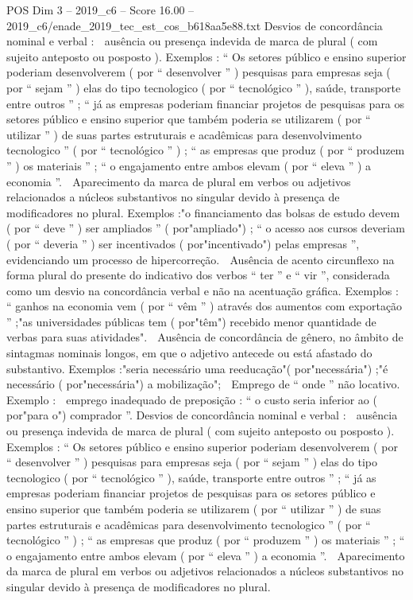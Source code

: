 \begin{textsample}{POS Dim 3 – 2019\_c6 – Score 16.00 – 2019\_c6/enade\_2019\_tec\_est\_cos\_b618aa5e88.txt}
Desvios de concordância nominal e verbal :  ausência ou presença indevida de marca de plural ( com sujeito anteposto ou posposto ).
Exemplos : “ Os setores público e ensino superior poderiam desenvolverem ( por “ desenvolver ” ) pesquisas para empresas seja ( por “ sejam ” ) elas do tipo tecnologico ( por “ tecnológico ” ), saúde, transporte entre outros ” ; “ já as empresas poderiam financiar projetos de pesquisas para os setores público e ensino superior que também poderia se utilizarem ( por “ utilizar ” ) de suas partes estruturais e acadêmicas para desenvolvimento tecnologico ” ( por “ tecnológico ” ) ; “ as empresas que produz ( por “ produzem ” ) os materiais ” ; “ o engajamento entre ambos elevam ( por “ eleva ” ) a economia ”.  Aparecimento da marca de plural em verbos ou adjetivos relacionados a núcleos substantivos no singular devido à presença de modificadores no plural.
Exemplos :"o financiamento das bolsas de estudo devem ( por “ deve ” ) ser ampliados ” ( por"ampliado") ; “ o acesso aos cursos deveriam ( por “ deveria ” ) ser incentivados ( por"incentivado") pelas empresas ”, evidenciando um processo de hipercorreção.  Ausência de acento circunflexo na forma plural do presente do indicativo dos verbos “ ter ” e “ vir ”, considerada como um desvio na concordância verbal e não na acentuação gráfica.
Exemplos : “ ganhos na economia vem ( por “ vêm ” ) através dos aumentos com exportação ” ;"as universidades públicas tem ( por"têm") recebido menor quantidade de verbas para suas atividades".  Ausência de concordância de gênero, no âmbito de sintagmas nominais longos, em que o adjetivo antecede ou está afastado do substantivo.
Exemplos :"seria necessário uma reeducação"( por"necessária") ;"é necessário ( por"necessária") a mobilização";  Emprego de “ onde ” não locativo.
Exemplo :  emprego inadequado de preposição : “ o custo seria inferior ao ( por"para o") comprador ”.
Desvios de concordância nominal e verbal :  ausência ou presença indevida de marca de plural ( com sujeito anteposto ou posposto ).
Exemplos : “ Os setores público e ensino superior poderiam desenvolverem ( por “ desenvolver ” ) pesquisas para empresas seja ( por “ sejam ” ) elas do tipo tecnologico ( por “ tecnológico ” ), saúde, transporte entre outros ” ; “ já as empresas poderiam financiar projetos de pesquisas para os setores público e ensino superior que também poderia se utilizarem ( por “ utilizar ” ) de suas partes estruturais e acadêmicas para desenvolvimento tecnologico ” ( por “ tecnológico ” ) ; “ as empresas que produz ( por “ produzem ” ) os materiais ” ; “ o engajamento entre ambos elevam ( por “ eleva ” ) a economia ”.  Aparecimento da marca de plural em verbos ou adjetivos relacionados a núcleos substantivos no singular devido à presença de modificadores no plural.

\end{textsample}
